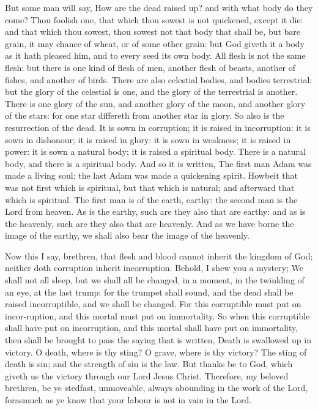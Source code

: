 But some man will say, How are the dead raised up?
and with what body do they come? Thou foolish one, that which thou sowest
is not quickened, except it die: and that which thou sowest, thou sowest
not that body that shall be, but bare grain, it may chance of wheat, or
of some other grain: but God giveth it a body as it hath pleased him,
and to every seed its own body. All flesh is not the same flesh: but there
is one kind of flesh of men, another flesh of beasts, another of fishes,
and another of birds. There are also celestial bodies, and bodies terrestrial:
but the glory of the celestial is one, and the glory of the terrestrial
is another. There is one glory of the sun, and another glory of the moon,
and another glory of the stars: for one star differeth from another star
in glory. So also is the resurrection of the dead. It is sown in corruption;
it is raised in incorruption: it is sown in dishonour; it is raised in
glory: it is sown in weakness; it is raised in power: it is sown a natural
body; it is raised a spiritual body. There is a natural body, and there
is a spiritual body. And so it is written, The first man Adam was made
a living soul; the last Adam was made a quickening spirit. Howbeit that
was not first which is spiritual, but that which is natural; and afterward
that which is spiritual. The first man is of the earth, earthy: the second
man is the Lord from heaven. As is the earthy, such are they also that
are earthy: and as is the heavenly, such are they also that are heavenly.
And as we have borne the image of the earthy, we shall also bear the image
of the heavenly.

Now this I say, brethren, that flesh and blood cannot
inherit the kingdom of God; neither doth corruption inherit incorruption.
Behold, I shew you a mystery; We shall not all sleep, but we shall all
be changed, in a moment, in the twinkling of an eye, at the last trump:
for the trumpet shall sound, and the dead shall be raised incorruptible,
and we shall be changed. For this corruptible must put on incor-ruption,
and this mortal must put on immortality. So when this corruptible shall
have put on incorruption, and this mortal shall have put on immortality,
then shall be brought to pass the saying that is written, Death is swallowed
up in victory. O death, where is thy sting? O grave, where is thy victory?
The sting of death is sin; and the strength of sin is the law. But thanks
be to God, which giveth us the victory through our Lord Jesus Christ.
Therefore, my beloved brethren, be ye stedfast, unmoveable, always abounding
in the work of the Lord, forasmuch as ye know that your labour is not
in vain in the Lord. 

